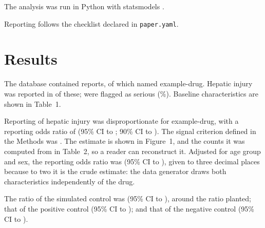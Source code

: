 \documentclass{article}
\begin{document}
The analysis was run in Python  with statsmodels
.

Reporting follows the checklist declared in \texttt{paper.yaml}.


\section{Results}

The database contained  reports, of which
 named example-drug. Hepatic injury was reported in
 of these;  were flagged as serious
(\%). Baseline characteristics are shown in Table~1.

\begin{table}\caption{Characteristics of the reports.}\label{tab:baseline}\end{table}

Reporting of hepatic injury was disproportionate for example-drug, with a reporting odds
ratio of  (95\% CI  to
; 90\% CI  to ). The
signal criterion defined in the Methods was . The estimate is shown
in Figure~1, and the counts it was computed from in Table~2, so a reader
can reconstruct it. Adjusted for age group and sex, the reporting odds ratio was
 (95\% CI  to
), given to three decimal places because to two it is the
crude estimate: the data generator draws both characteristics independently of the drug.

The ratio of the simulated control was  (95\% CI
 to ), around the
ratio planted; that of the positive control  (95\% CI
 to ); and that of
the negative control  (95\% CI
 to ).
\end{document}
